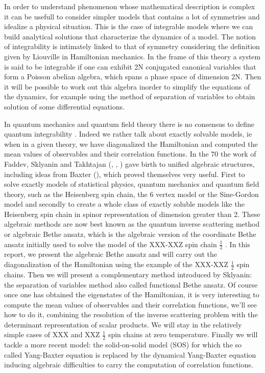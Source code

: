 \documentclass[12pt]{article}
\begin{document}
In order to understand phenomenon whose mathematical description is complex it can be usefull to consider simpler models that  contains a lot of symmetries and idealize a physical situation. This is the case of integrable models where we can build analytical solutions that characterize the dynamics of a model. The notion of integrability is intimately linked to that of symmetry considering the definition given by Liouville in Hamiltonian mechanics. In the frame of this theory a system is said to be integrable if one can exhibit 2N conjugated canonical variables that form a Poisson abelian algebra, which spans a phase space of dimension 2N. Then it will be possible to work out this algebra inorder to simplify the equations of the dynamics, for example using the method of separation of variables to obtain solution of some differential equations. %

In quantum mechanics and quantum field theory there is no consensus to define quantum integrability \cite{CauM10u}. Indeed we rather talk about exactly solvable models, ie when in a given theory, we have diagonalized the Hamiltonian and computed the mean values ​​of observables and their correlation functions. 
In the 70 the work of Faddev, Sklyanin and Takhtajan (\cite{FadT81}, \cite{FadST79}, \cite{Skl82}) gave birth to unified algebraic structures, including ideas from Baxter (\cite{Bax82L}), which proved themselves very useful. First to solve exactly models of statistical physics, quantum mechanics and quantum field theory, such as the Heisenberg spin chain, the 6 vertex model or the Sine-Gordon model and secondly to create a whole class of exactly soluble models like the Heisenberg spin chain in spinor representation of dimension greater than 2. 
These algebraic methods are now best known as the quantum inverse scattering method or algebraic Bethe ansatz, which is the algebraic version of the coordinate Bethe ansatz initially used to solve the model of the XXX-XXZ spin chain $ \frac{1}{2} $ \cite{Bet31}. 
In this report, we present the algebraic Bethe ansatz %
and will carry out the diagonalization of the Hamiltonian using the example of the XXX-XXZ $ \frac{1}{2} $ spin chains. Then we will present a complementary method introduced by Sklyanin: the separation of variables method also called functional Bethe ansatz. Of course once one has obtained the eigenstates of the Hamiltonian, it is very interesting to compute the mean values ​​of observables and their correlation functions, we'll see how to do it, combining  the resolution of the inverse scattering problem with the determinant representation of scalar products. We will stay in the relatively simple cases of XXX and XXZ $ \frac{1}{2} $ spin chains  at zero temperature. 
Finally we will tackle a more recent model: the solid-on-solid model (SOS) for which the so called Yang-Baxter equation is replaced by the dynamical Yang-Baxter equation inducing algebraic difficulties to carry the computation of correlation functions. 
\pagebreak
\end{document}
